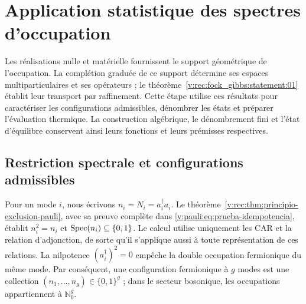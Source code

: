 \section{Application statistique des spectres d’occupation}
\label{v:rec:chap:ocupacion-estadistica}

Les réalisations nulle et matérielle fournissent le support géométrique de
l’occupation. La complétion graduée de ce support détermine ses espaces
multiparticulaires et ses opérateurs ; le
théorème~\ref{v:rec:fock_gibbs:statement:01} établit leur transport par
raffinement. Cette étape utilise ces résultats pour caractériser les
configurations admissibles, dénombrer les états et préparer l’évaluation thermique.
La construction algébrique, le dénombrement fini et l’état d’équilibre
conservent ainsi leurs fonctions et leurs prémisses respectives.

\subsection{Restriction spectrale et configurations admissibles}
\label{v:rec:pauli:section:02}

Pour un mode \(i\), nous écrivons \(n_i=N_i=a_i^\dagger a_i\). Le
théorème~\ref{v:rec:thm:principio-exclusion-pauli}, avec sa preuve complète dans
\eqref{v:pauli:eq:prueba-idempotencia}, établit
\(n_i^2=n_i\) et \(\operatorname{Spec}(n_i)\subseteq\{0,1\}\). Le calcul utilise
uniquement les CAR et la relation d’adjonction, de sorte qu’il s’applique aussi
à toute représentation de ces relations. La nilpotence
\((a_i^\dagger)^2=0\) empêche la double occupation fermionique du même mode.
Par conséquent, une configuration fermionique à \(g\) modes est une
collection \((n_1,\ldots,n_g)\in\{0,1\}^g\) ; dans le secteur bosonique, les
occupations appartiennent à \(\mathbb N_0^g\).

